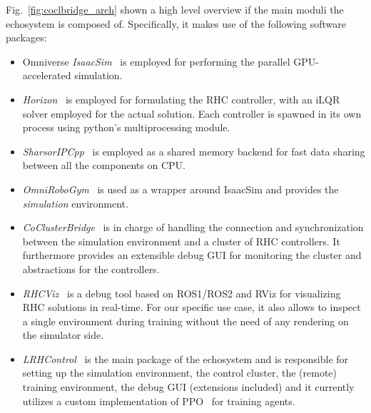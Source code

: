 Fig.~\ref{fig:coclbridge_arch} shown a high level overview if the main moduli the echosystem is composed of. Specifically, it makes use of the following software packages:
\begin{itemize}
	\item Omniverse \textit{IsaacSim}~\cite{rl:makoviychuk2021isaac} is employed for performing the parallel GPU-accelerated simulation.
	\item \textit{Horizon}~\cite{frameworks::horizon_to} is employed for formulating the RHC controller, with an iLQR solver employed for the actual solution. Each controller is spawned in its own process using python's multiprocessing module.
	\item \textit{SharsorIPCpp}~\cite{mystuff::sharsoripcpp} is employed as a shared memory backend for fast data sharing between all the components on CPU.
	\item \textit{OmniRoboGym}~\cite{mystuff::omnirobogym} is used as a wrapper around IsaacSim and provides the \textit{simulation} environment.
	\item \textit{CoClusterBridge}~\cite{mystuff::coclusterbridge} is in charge of handling the connection and synchronization between the simulation environment and a cluster of RHC controllers. It furthermore provides an extensible debug GUI for monitoring the cluster and abstractions for the controllers.
	\item \textit{RHCViz}~\cite{mystuff::rhcviz} is a debug tool based on ROS1/ROS2 and RViz for visualizing RHC solutions in real-time. For our specific use case, it also allows to inspect a single environment during training without the need of any rendering on the simulator side.
	\item \textit{LRHControl}~\cite{mystuff::lrhccontrol} is the main package of the echosystem and is responsible for setting up the simulation environment, the control cluster, the (remote) training environment, the debug GUI (extensions included) and it currently utilizes a custom implementation of PPO~\cite{rl:schulman2017proximal} for training agents.
\end{itemize}




